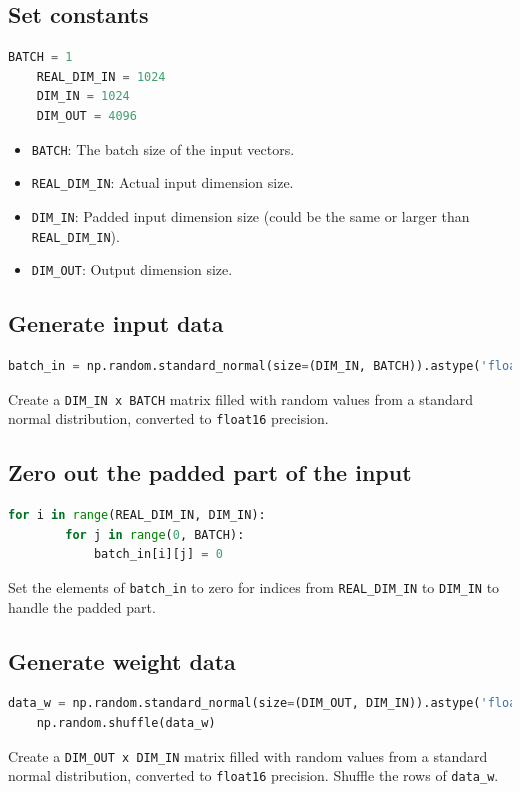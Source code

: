 \documentclass[12pt]{article}
\begin{document}
\subsection{Set constants}
\begin{lstlisting}[language=Python]
	BATCH = 1
	REAL_DIM_IN = 1024
	DIM_IN = 1024
	DIM_OUT = 4096
\end{lstlisting}
\begin{itemize}
	\item \texttt{BATCH}: The batch size of the input vectors.
	\item \texttt{REAL\_DIM\_IN}: Actual input dimension size.
	\item \texttt{DIM\_IN}: Padded input dimension size (could be the same or larger than \texttt{REAL\_DIM\_IN}).
	\item \texttt{DIM\_OUT}: Output dimension size.
\end{itemize}

\subsection{Generate input data}
\begin{lstlisting}[language=Python]
	batch_in = np.random.standard_normal(size=(DIM_IN, BATCH)).astype('float16')
\end{lstlisting}
Create a \texttt{DIM\_IN x BATCH} matrix filled with random values from a standard normal distribution, converted to \texttt{float16} precision.

\subsection{Zero out the padded part of the input}
\begin{lstlisting}[language=Python]
	for i in range(REAL_DIM_IN, DIM_IN):
		for j in range(0, BATCH):
			batch_in[i][j] = 0
\end{lstlisting}
Set the elements of \texttt{batch\_in} to zero for indices from \texttt{REAL\_DIM\_IN} to \texttt{DIM\_IN} to handle the padded part.

\subsection{Generate weight data}
\begin{lstlisting}[language=Python]
	data_w = np.random.standard_normal(size=(DIM_OUT, DIM_IN)).astype('float16')
	np.random.shuffle(data_w)
\end{lstlisting}
Create a \texttt{DIM\_OUT x DIM\_IN} matrix filled with random values from a standard normal distribution, converted to \texttt{float16} precision. Shuffle the rows of \texttt{data\_w}.
\end{document}
